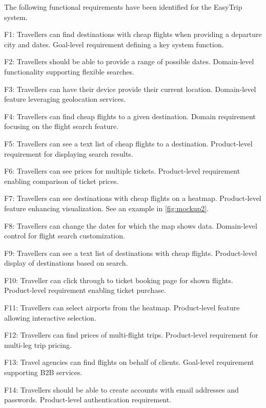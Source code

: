 The following functional requirements have been identified for the EasyTrip system.

F1: Travellers can find destinations with cheap flights when providing a departure city and dates.
    Goal-level requirement defining a key system function.
    
F2: Travellers should be able to provide a range of possible dates.
    Domain-level functionality supporting flexible searches.
    
F3: Travellers can have their device provide their current location.
    Domain-level feature leveraging geolocation services.
    
F4: Travellers can find cheap flights to a given destination.
    Domain requirement focusing on the flight search feature.
    
F5: Travellers can see a text list of cheap flights to a destination.
    Product-level requirement for displaying search results.
    
F6: Travellers can see prices for multiple tickets.
    Product-level requirement enabling comparison of ticket prices.

F7: Travellers can see destinations with cheap flights on a heatmap.
    Product-level feature enhancing visualization. See an example in \autoref{fig:mockup2}.

F8: Travellers can change the dates for which the map shows data.
    Domain-level control for flight search customization.

F9: Travellers can see a text list of destinations with cheap flights.
    Product-level display of destinations based on search.

F10: Traveller can click through to ticket booking page for shown flights.
    Product-level requirement enabling ticket purchase.

F11: Travellers can select airports from the heatmap.
    Product-level feature allowing interactive selection.

F12: Travellers can find prices of multi-flight trips.
    Product-level requirement for multi-leg trip pricing.

F13: Travel agencies can find flights on behalf of clients.
    Goal-level requirement supporting B2B services.

F14: Travellers should be able to create accounts with email addresses and passwords.
    Product-level authentication requirement.

